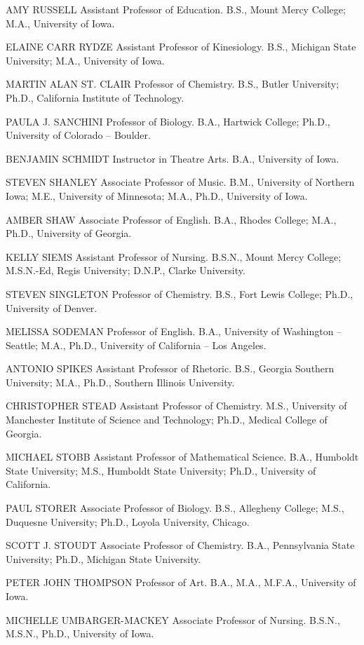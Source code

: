 \documentclass[
  letterpaper,
]{scrbook}
\begin{document}
AMY RUSSELL Assistant Professor of Education. B.S., Mount Mercy College;
M.A., University of Iowa.

ELAINE CARR RYDZE Assistant Professor of Kinesiology. B.S., Michigan
State University; M.A., University of Iowa.

MARTIN ALAN ST. CLAIR Professor of Chemistry. B.S., Butler University;
Ph.D., California Institute of Technology.

PAULA J. SANCHINI Professor of Biology. B.A., Hartwick College; Ph.D.,
University of Colorado -- Boulder.

BENJAMIN SCHMIDT Instructor in Theatre Arts. B.A., University of Iowa.

STEVEN SHANLEY Associate Professor of Music. B.M., University of
Northern Iowa; M.E., University of Minnesota; M.A., Ph.D., University of
Iowa.

AMBER SHAW Associate Professor of English. B.A., Rhodes College; M.A.,
Ph.D., University of Georgia.

KELLY SIEMS Assistant Professor of Nursing. B.S.N., Mount Mercy College;
M.S.N.-Ed, Regis University; D.N.P., Clarke University.

STEVEN SINGLETON Professor of Chemistry. B.S., Fort Lewis College;
Ph.D., University of Denver.

MELISSA SODEMAN Professor of English. B.A., University of Washington --
Seattle; M.A., Ph.D., University of California -- Los Angeles.

ANTONIO SPIKES Assistant Professor of Rhetoric. B.S., Georgia Southern
University; M.A., Ph.D., Southern Illinois University.

CHRISTOPHER STEAD Assistant Professor of Chemistry. M.S., University of
Manchester Institute of Science and Technology; Ph.D., Medical College
of Georgia.

MICHAEL STOBB Assistant Professor of Mathematical Science. B.A.,
Humboldt State University; M.S., Humboldt State University; Ph.D.,
University of California.

PAUL STORER Associate Professor of Biology. B.S., Allegheny College;
M.S., Duquesne University; Ph.D., Loyola University, Chicago.

SCOTT J. STOUDT Associate Professor of Chemistry. B.A., Pennsylvania
State University; Ph.D., Michigan State University.

PETER JOHN THOMPSON Professor of Art. B.A., M.A., M.F.A., University of
Iowa.

MICHELLE UMBARGER-MACKEY Associate Professor of Nursing. B.S.N., M.S.N.,
Ph.D., University of Iowa.
\end{document}
